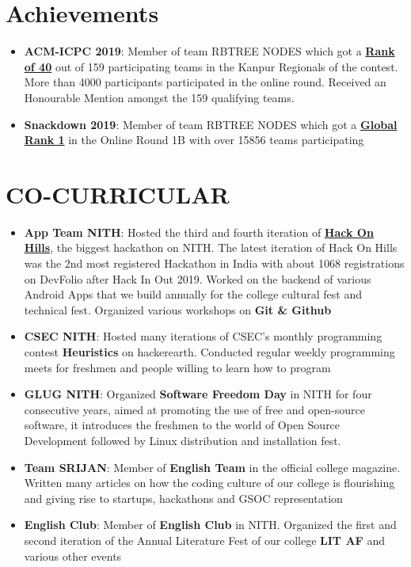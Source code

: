 \documentclass[letterpaper,11pt]{article}
\newcommand{\resumeItem}[2]{
  \item\small{
    \textbf{#1}{: #2 \vspace{-5pt}}
  }
}
\newcommand{\resumeSubItem}[2]{\resumeItem{#1}{#2}\vspace{-3pt}}
\newcommand{\resumeSubHeadingListStart}{\begin{itemize}[leftmargin=*]}
\newcommand{\resumeSubHeadingListEnd}{\end{itemize}}
\begin{document}
\section{Achievements}
  \resumeSubHeadingListStart
    \resumeSubItem{ACM-ICPC 2019}
      {Member of team RBTREE NODES which got a \href{https://www.codechef.com/public/rankings/ACM18KOL}{\textbf{Rank of 40}} out of 159 participating teams in the Kanpur Regionals of the contest. More than 4000 participants participated in the online round. Received an Honourable Mention amongst the 159 qualifying teams.}
    \resumeSubItem{Snackdown 2019}
      {Member of team RBTREE NODES which got a \href{https://www.codechef.com/rankings/SNCK1B19?order=asc&search=rbtree&sortBy=rank}{\textbf{Global Rank 1}} in the Online Round 1B with over 15856 teams participating} 
  \resumeSubHeadingListEnd

\section{CO-CURRICULAR}
  \resumeSubHeadingListStart
    \resumeSubItem{App Team NITH}
      {Hosted the third and fourth iteration of \href{https://www.hackonhills.com/}{\textbf{Hack On Hills}}, the biggest hackathon on NITH. The latest iteration of Hack On Hills was the 2nd most registered Hackathon in India with about 1068 registrations on DevFolio after Hack In Out 2019. Worked on the backend of various Android Apps that we build annually for the college cultural fest and technical fest. Organized various workshops on \textbf{Git \& Github}}
    \resumeSubItem{CSEC NITH}
      {Hosted many iterations of CSEC's monthly programming contest \textbf{Heuristics} on hackerearth. Conducted regular weekly programming meets for freshmen and people willing to learn how to program}
    \resumeSubItem{GLUG NITH}
      {Organized \textbf{Software Freedom Day} in NITH for four consecutive years, aimed at promoting the use of free and open-source software, it introduces the freshmen to the world of Open Source Development followed by Linux distribution and installation fest.} 
    \resumeSubItem{Team SRIJAN}
      {Member of \textbf{English Team} in the official college magazine. Written many articles on how the coding culture of our college is flourishing and giving rise to startups, hackathons and GSOC representation}
    \resumeSubItem{English Club}
      {Member of \textbf{English Club} in NITH. Organized the first and second iteration of the Annual Literature Fest of our college \textbf{LIT AF} and various other events}
  \resumeSubHeadingListEnd
\end{document}
